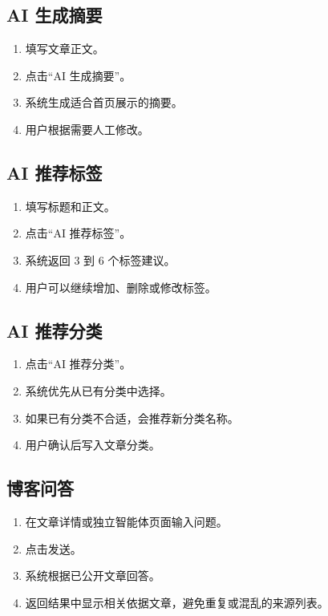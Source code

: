 \documentclass[UTF8,a4paper,12pt]{ctexart}
\begin{document}
\subsection{AI 生成摘要}

\begin{enumerate}
  \item 填写文章正文。
  \item 点击“AI 生成摘要”。
  \item 系统生成适合首页展示的摘要。
  \item 用户根据需要人工修改。
\end{enumerate}

\subsection{AI 推荐标签}

\begin{enumerate}
  \item 填写标题和正文。
  \item 点击“AI 推荐标签”。
  \item 系统返回 3 到 6 个标签建议。
  \item 用户可以继续增加、删除或修改标签。
\end{enumerate}

\subsection{AI 推荐分类}

\begin{enumerate}
  \item 点击“AI 推荐分类”。
  \item 系统优先从已有分类中选择。
  \item 如果已有分类不合适，会推荐新分类名称。
  \item 用户确认后写入文章分类。
\end{enumerate}

\subsection{博客问答}

\begin{enumerate}
  \item 在文章详情或独立智能体页面输入问题。
  \item 点击发送。
  \item 系统根据已公开文章回答。
  \item 返回结果中显示相关依据文章，避免重复或混乱的来源列表。
\end{enumerate}
\end{document}
